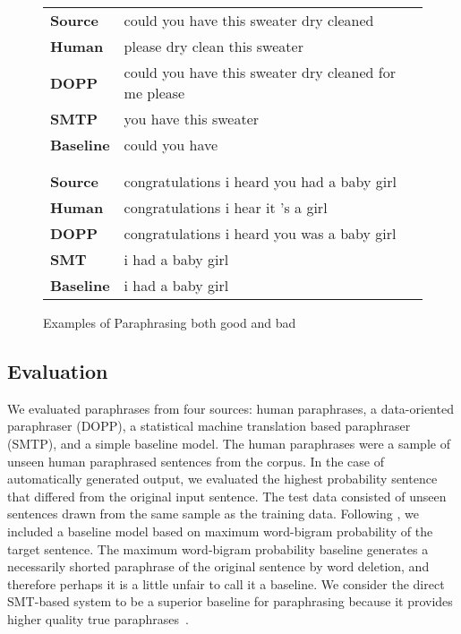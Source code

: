 \begin{figure}
\begin{flushleft}
\small
\begin{center}
\begin{tabular} {lp{8cm}}
{\bf Source} &    could you have this sweater dry cleaned\\
{\bf Human} &     please dry clean this sweater \\
{\bf DOPP} &      could you have this sweater dry cleaned for me please \\
{\bf SMTP} &       you have this sweater \\
{\bf Baseline} &  could you have \\
\\[-2mm]
\hline
\\[-2mm]
\textbf{Source} &    congratulations i heard you had a baby girl\\
\textbf{Human} &     congratulations i hear it 's a girl \\
\textbf{DOPP} &      congratulations i heard you was a baby girl\\
\textbf{SMT} &       i had a baby girl \\
\textbf{Baseline} &  i had a baby girl \\
\end{tabular}
\end{center}
\end{flushleft}
\caption{Examples of Paraphrasing both good and bad}
\label{figure:examples}
\end{figure}

\subsection{Evaluation}

We evaluated paraphrases from four sources: human paraphrases, a data-oriented paraphraser (DOPP), a statistical
machine translation based paraphraser (SMTP), and a simple baseline model.  The human paraphrases were a sample
of unseen human paraphrased sentences from the corpus. In the case of automatically generated output, we 
evaluated the highest probability sentence that differed from the original input sentence. The test data
consisted of unseen sentences drawn from the same sample as the  training data. Following \cite{Knight:00}, we
included a baseline model based on maximum word-bigram probability of the target sentence. The maximum
word-bigram probability baseline generates a necessarily shorted paraphrase of the original sentence by word
deletion, and therefore perhaps it is a little unfair to call it a baseline. We consider the direct SMT-based
system to be a superior baseline for paraphrasing because it provides higher quality true
paraphrases~\cite{finch:fit2002}.


